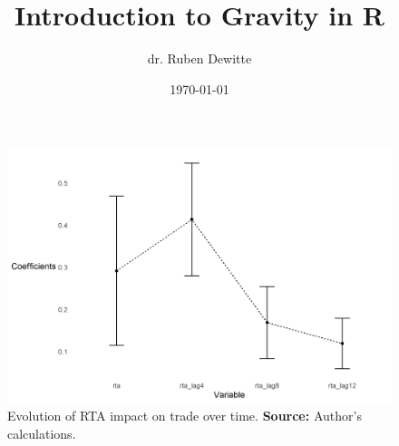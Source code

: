 \documentclass[a4paper,11pt]{article}
\title{Introduction to Gravity in R}
\author{dr. Ruben Dewitte}
\date{\today}
\begin{document}
	\maketitle
	
	








\begin{figure}[htbp]
	\centering
	\includegraphics[width=\textwidth]{fig_rta_evo.png}
	\caption{Evolution of RTA impact on trade over time. \newline
		\textbf{Source:} Author's calculations.}
	\label{fig_foreign_born}
\end{figure}


%
%
%
%
%	
\end{document}
